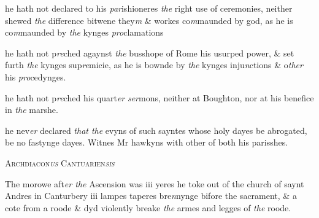 \documentclass[12pt, a4paper]{book}
\begin{document}
	
		\ifthenelse{\isodd{\thepage}}
		{\reversemarginpar}
		{\normalmarginpar}
		he hath not declared to his \textit{par}ishioneres \textit{the} right use of
 ceremonies, neither shewed \textit{the} difference bitwene they\textit{m}
 \& workes co\textit{m}maunded by god, as he is co\textit{m}maunded by \textit{the}
  kynges \textit{pro}clamations
            	
			
		\ifthenelse{\isodd{\thepage}}
		{\reversemarginpar}
		{\normalmarginpar}
		he hath not p\textit{re}ched agaynst \textit{the} busshope of Rome his
 usurped power, \& set furth \textit{the} kynges sup\textit{re}micie, as he
 	is bownde by \textit{the} kynges inju\textit{n}ctions \& o\textit{ther} his \textit{pro}cedynges.
 
		\ifthenelse{\isodd{\thepage}}
		{\reversemarginpar}
		{\normalmarginpar}
		he hath not p\textit{re}ched his quart\textit{er}
               \textit{ser}mons, neither at
 Boughton, nor at his benefice in \textit{the} marshe.
 
 	
				\marginpar[\vspace{0.5cm}{\textcolor{Gray}{proclamations}}]{}
			
 	
		\ifthenelse{\isodd{\thepage}}
		{\reversemarginpar}
		{\normalmarginpar}
		he nev\textit{er} declared \textit{that the} evyns of such sayntes whose holy
 dayes be abrogated, be no fastynge dayes. Witnes Mr
 hawkyns with other of both his parisshes.
 
 

            
               
				\begin{center} \begin{large} {\scshape Archdiacon\textit{us} Cantuarien\textit{sis}
               } \end{large} \end{center}
			


	
				\marginpar[\vspace{0.5cm}{\textcolor{Gray}{Images}}]{}
			
	
		\ifthenelse{\isodd{\thepage}}
		{\reversemarginpar}
		{\normalmarginpar}
		The morowe aft\textit{er the} Ascension was iii yeres he toke out
		of the church of saynt Andres in Canturbery iii lampes
 taperes bre\textit{n}nynge bifore the sacrament, \& a cote from a roode
 \& dyd violently breake \textit{the} armes and legges of \textit{the} roode.
 
\end{document}
